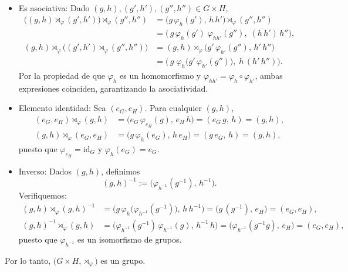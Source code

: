 \begin{itemize}
	\item Es asociativa: Dado \((g,h),(g',h'),(g'',h'')\in G\times H\),  
	\begin{align*}
		\bigl((g,h)\!\rtimes_{\varphi}\!(g',h')\bigr)\!\rtimes_{\varphi}\!(g'',h'')
		&=
		\bigl(g\,\varphi_h(g'),\,h\,h'\bigr)\!\rtimes_{\varphi}\!(g'',h'')
		\\
		&=
		\bigl(\,g\,\varphi_h(g')\;\varphi_{h h'}(g''),\;(h\,h')\,h''\bigr),
		\\
		(g,h)\!\rtimes_{\varphi}\!\bigl((g',h')\!\rtimes_{\varphi}\!(g'',h'')\bigr)
		&=
		(g,h)\!\rtimes_{\varphi}\!\bigl(g'\,\varphi_{h'}(g''),\,h'\,h''\bigr)
		\\
		&=
		\bigl(\,g\;\varphi_h\bigl(g'\,\varphi_{h'}(g'')\bigr),\;h\,(h'\,h'')\bigr).
	\end{align*}
	Por la propiedad de que \(\varphi_h\) es un homomorfismo y \(\varphi_{h h'}=\varphi_h\circ\varphi_{h'}\), ambas expresiones coinciden, garantizando la asociatividad.
	
	\item Elemento identidad: Sea \((e_G,e_H)\). Para cualquier \((g,h)\),  
	\begin{align*}
		(e_G,e_H)\!\rtimes_{\varphi}\!(g,h)
		&=
		\bigl(e_G\,\varphi_{e_H}(g),\,e_H\,h\bigr)
		=
		(e_G\,g,\,h)
		=
		(g,h),
		\\
		(g,h)\!\rtimes_{\varphi}\!(e_G,e_H)
		&=
		\bigl(g\,\varphi_h(e_G),\,h\,e_H\bigr)
		=
		(g\,e_G,\,h)
		=
		(g,h),
	\end{align*}
	puesto que \(\varphi_{e_H}=\mathrm{id}_G\) y \(\varphi_h(e_G)=e_G\).
	
	\item Inverso: Dados \((g,h)\), definimos
	\[
	(g,h)^{-1}
	:=
	\bigl(\varphi_{h^{-1}}(g^{-1}),\,h^{-1}\bigr).
	\]
	Verifiquemos:
	\begin{align*}
		(g,h)\!\rtimes_{\varphi}\!(g,h)^{-1}
		&=
		\bigl(g\,\varphi_h\bigl(\varphi_{h^{-1}}(g^{-1})\bigr),\,h\,h^{-1}\bigr)
		=
		\bigl(g\,(g^{-1}),\,e_H\bigr)
		=
		(e_G,e_H),
		\\
		(g,h)^{-1}\!\rtimes_{\varphi}\!(g,h)
		&=
		\bigl(\varphi_{h^{-1}}(g^{-1})\,\varphi_{h^{-1}}(g),\,h^{-1}\,h\bigr)
		=
		\bigl(\varphi_{h^{-1}}(g^{-1}g),\,e_H\bigr)
		=
		(e_G,e_H),
	\end{align*}
	puesto que \(\varphi_{h^{-1}}\) es un isomorfismo de grupos.
\end{itemize}
Por lo tanto, \(\bigl(G\times H,\rtimes_{\varphi}\bigr)\) es un grupo.


